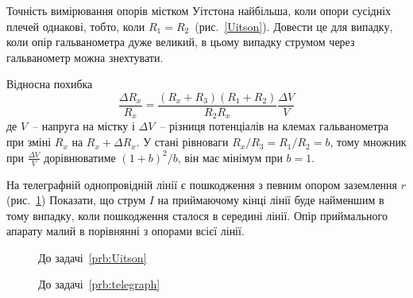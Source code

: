 \begin{problem}\label{prb:Uitson}%
Точність вимірювання опорів містком Уітстона найбільша, коли опори сусідніх плечей однакові, тобто, коли $R_1 = R_2$~(рис.~\ref{Uitson}). Довести це для випадку, коли опір гальванометра дуже великий, в цьому випадку струмом через гальванометр можна знехтувати.
\begin{solution}
	Відносна похибка
	\[
		\frac{\Delta R_x}{R_x} = \frac{(R_x + R_3)(R_1 + R_2)}{R_2 R_x}\frac{\Delta V}{V}
	\]
	де $V$~-- напруга на містку і $\Delta V$~-- різниця потенціалів на клемах гальванометра при зміні $R_x$ на $R_x + \Delta R_x$. У стані рівноваги $R_x / R_3 = R_1 / R_2 = b$, тому множник при $\frac{\Delta V}{V}$ дорівнюватиме $(1+b)^2/b$, він має мінімум при $b = 1$.
\end{solution}
\end{problem}

\begin{problem}\label{prb:telegraph} %
На телеграфній однопровідній лінії є пошкодження з певним опором заземлення $r$ (рис.~\ref{telegraph}) Показати, що струм $I$ на приймаючому кінці лінії буде найменшим в тому випадку, коли пошкодження сталося в середині лінії. Опір приймального апарату малий в порівнянні з опорами всієї лінії.
\end{problem}

\begin{figure}[h!]\centering
	\begin{minipage}[t]{0.45\linewidth}\centering
		\caption{До задачі~\ref{prb:Uitson}}
		\label{Uitson}
	\end{minipage}
	\begin{minipage}[t]{0.45\linewidth}\centering
		\caption{До задачі~\ref{prb:telegraph}}
		\label{telegraph}
	\end{minipage}
\end{figure}

